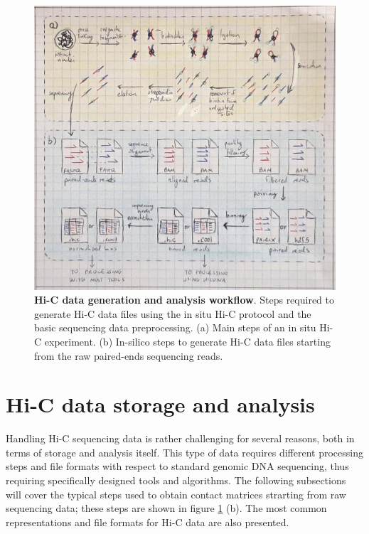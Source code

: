 \begin{figure}[ht]
  \centering
  \includegraphics[width=1\textwidth]{hic_pipeline.jpeg}
  \caption{\textbf{Hi-C data generation and analysis workflow}. Steps required to generate Hi-C data files using the in situ Hi-C protocol and the basic sequencing data preprocessing. (a) Main steps of an in situ Hi-C experiment. (b) In-silico steps to generate Hi-C data files starting from the raw paired-ends sequencing reads.}
  \label{fig:pipeline}
\end{figure}

\newpage
\section{Hi-C data storage and analysis}

Handling Hi-C sequencing data is rather challenging for several reasons, both in terms of storage and analysis itself. This type of data requires different processing steps and file formats with respect to standard genomic DNA sequencing, thus requiring specifically designed tools and algorithms. The following subsections will cover the typical steps used to obtain contact matrices strarting from raw sequencing data\cite{hicprocessing2018}; these steps are shown in figure \ref{fig:pipeline} (b). The most common representations and file formats for Hi-C data are also presented.

